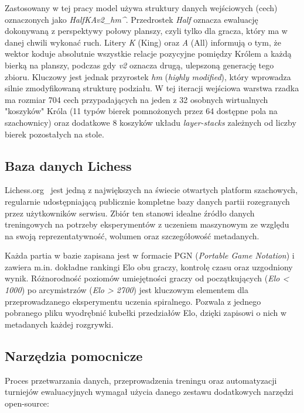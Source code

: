 \documentclass[12pt,a4paper]{report}
\begin{document}
Zastosowany w tej pracy model używa struktury danych wejściowych (cech) oznaczonych jako \textit{HalfKAv2\_hm\string^}. Przedrostek \textit{Half} oznacza ewaluację dokonywaną z perspektywy połowy planszy, czyli tylko dla gracza, który ma w danej chwili wykonać ruch. Litery \textit{K} (King) oraz \textit{A} (All) informują o tym, że wektor koduje absolutnie wszystkie relacje pozycyjne pomiędzy Królem a każdą bierką na planszy, podczas gdy \textit{v2} oznacza drugą, ulepszoną generację tego zbioru. Kluczowy jest jednak przyrostek \textit{hm} (\textit{highly modified}), który wprowadza silnie zmodyfikowaną strukturę podziału. W tej iteracji wejściowa warstwa rzadka ma rozmiar 704 cech przypadających na jeden z 32 osobnych wirtualnych "koszyków" Króla (11 typów bierek pomnożonych przez 64 dostępne pola na szachownicy) oraz dodatkowe 8 koszyków układu \textit{layer-stacks} zależnych od liczby bierek pozostałych na stole.

\subsection{Baza danych Lichess}

Lichess.org~\cite{lichess} jest jedną z największych na świecie otwartych platform szachowych, regularnie udostępniającą publicznie kompletne bazy danych partii rozegranych przez użytkowników serwisu. Zbiór ten stanowi idealne źródło danych treningowych na potrzeby eksperymentów z uczeniem maszynowym ze względu na swoją reprezentatywność, wolumen oraz szczegółowość metadanych.

Każda partia w bazie zapisana jest w formacie PGN (\textit{Portable Game Notation}) i zawiera m.in. dokładne rankingi Elo obu graczy, kontrolę czasu oraz uzgodniony wynik. Różnorodność poziomów umiejętności graczy od początkujących (\textit{Elo < 1000}) po arcymistrzów (\textit{Elo > 2700}) jest kluczowym elementem dla przeprowadzanego eksperymentu uczenia spiralnego. Pozwala z jednego pobranego pliku wyodrębnić kubełki przedziałów Elo, dzięki zapisowi o nich w metadanych każdej rozgrywki.

\subsection{Narzędzia pomocnicze}

Proces przetwarzania danych, przeprowadzenia treningu oraz automatyzacji turniejów ewaluacyjnych wymagał użycia danego zestawu dodatkowych narzędzi open-source:
\end{document}
